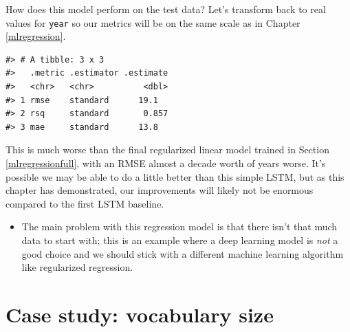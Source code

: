 \documentclass[
]{krantz}
\makeatletter
\newenvironment{Shaded}{\begin{snugshade}}{\end{snugshade}}
\newcommand{\AttributeTok}[1]{\textcolor[rgb]{0.77,0.63,0.00}{#1}}
\newcommand{\DecValTok}[1]{\textcolor[rgb]{0.00,0.00,0.81}{#1}}
\newcommand{\FunctionTok}[1]{\textcolor[rgb]{0.00,0.00,0.00}{#1}}
\newcommand{\NormalTok}[1]{#1}
\newcommand{\OtherTok}[1]{\textcolor[rgb]{0.56,0.35,0.01}{#1}}
\newcommand{\SpecialCharTok}[1]{\textcolor[rgb]{0.00,0.00,0.00}{#1}}
\newenvironment{kframe}{%
\medskip{}
\setlength{\fboxsep}{.8em}
 \def\at@end@of@kframe{}%
 \ifinner\ifhmode%
  \def\at@end@of@kframe{\end{minipage}}%
  \begin{minipage}{\columnwidth}%
 \fi\fi%
 \def\FrameCommand##1{\hskip\@totalleftmargin \hskip-\fboxsep
 \colorbox{shadecolor}{##1}\hskip-\fboxsep
     \hskip-\linewidth \hskip-\@totalleftmargin \hskip\columnwidth}%
 \MakeFramed {\advance\hsize-\width
   \@totalleftmargin\z@ \linewidth\hsize
   \@setminipage}}%
 {\par\unskip\endMakeFramed%
 \at@end@of@kframe}
\renewenvironment{Shaded}{\begin{kframe}}{\end{kframe}}
\newenvironment{rmdblock}[1]
  {\begin{shaded*}
  \begin{itemize}[left = -1cm, labelsep = 1cm]
  \renewcommand{\labelitemi}{
    \raisebox{-.7\height}[0pt][0pt]{
      {\setkeys{Gin}{width=3em,keepaspectratio}\texttt{[image: images/\#1]}}
    }
  }
 
  \item
  }
  {
  \end{itemize}
  \end{shaded*}
  }
\newenvironment{rmdwarning}
  {\begin{rmdblock}{warning}}
  {\end{rmdblock}}
\makeatother
\begin{document}
How does this model perform on the test data? Let's transform back to real values for \texttt{year} so our metrics will be on the same scale as in Chapter \ref{mlregression}.

\begin{Shaded}
\end{Shaded}

\begin{verbatim}
#> # A tibble: 3 x 3
#>   .metric .estimator .estimate
#>   <chr>   <chr>          <dbl>
#> 1 rmse    standard      19.1  
#> 2 rsq     standard       0.857
#> 3 mae     standard      13.8
\end{verbatim}

This is much worse than the final regularized linear model trained in Section \ref{mlregressionfull}, with an RMSE almost a decade worth of years worse. It's possible we may be able to do a little better than this simple LSTM, but as this chapter has demonstrated, our improvements will likely not be enormous compared to the first LSTM baseline.

\begin{rmdwarning}
The main problem with this regression model is that there isn't that
much data to start with; this is an example where a deep learning model
is \emph{not} a good choice and we should stick with a different machine
learning algorithm like regularized regression.
\end{rmdwarning}

\hypertarget{case-study-vocabulary-size}{%
\section{Case study: vocabulary size}\label{case-study-vocabulary-size}}
\end{document}
